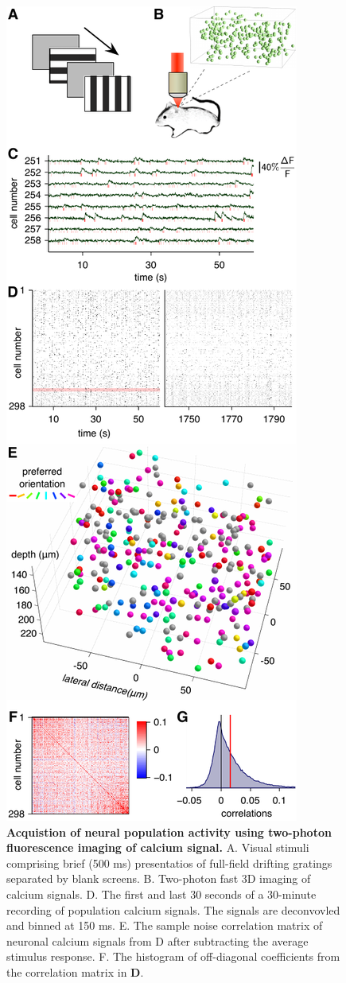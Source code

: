 \begin{figure}[htp]
\begin{center}
\includegraphics{figures/Acquisition.pdf}
\end{center}
\caption{
{\bf Acquistion of neural population activity using two-photon fluorescence imaging of calcium signal.}  {\sf A.} Visual stimuli comprising brief (500 ms) presentatios of full-field drifting gratings separated by blank screens. {\sf B.} Two-photon fast 3D imaging of calcium signals. {\sf D.} The first and last 30 seconds of a 30-minute recording of population calcium signals. The signals are deconvovled and binned at 150 ms. {\sf E.} The sample noise correlation matrix of neuronal calcium signals from {\sf D} after subtracting the average stimulus response. {\sf F.} The histogram of off-diagonal coefficients from the correlation matrix in {\bf D}.
}
\label{fig:01}
\end{figure}
